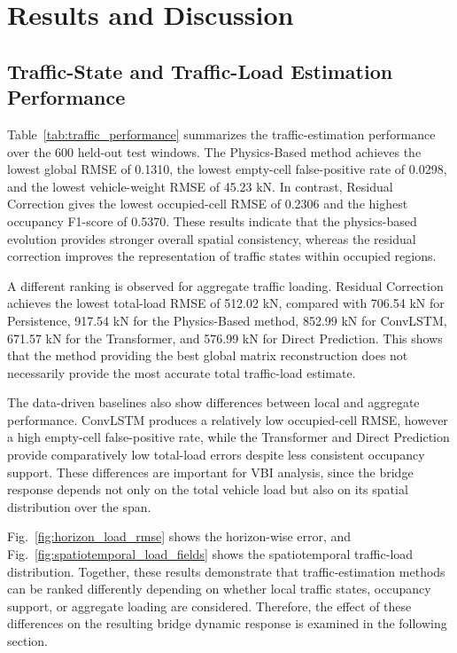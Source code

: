 \documentclass[journal]{IEEEtran}
\begin{document}
\section{Results and Discussion}

\subsection{Traffic-State and Traffic-Load Estimation Performance}
\label{sec:traffic_results}

Table~\ref{tab:traffic_performance} summarizes the
traffic-estimation performance over the 600 held-out test windows. The
Physics-Based method achieves the lowest global RMSE of 0.1310, the lowest
empty-cell false-positive rate of 0.0298, and the lowest vehicle-weight RMSE of
45.23 kN. In contrast, Residual Correction gives the lowest occupied-cell RMSE
of 0.2306 and the highest occupancy F1-score of 0.5370. These results indicate
that the physics-based evolution provides stronger overall spatial consistency,
whereas the residual correction improves the representation of traffic states
within occupied regions.

A different ranking is
observed for aggregate traffic loading. Residual Correction achieves the lowest
total-load RMSE of 512.02 kN, compared with 706.54 kN for Persistence, 917.54
kN for the Physics-Based method, 852.99 kN for ConvLSTM, 671.57 kN for the
Transformer, and 576.99 kN for Direct Prediction. This shows that the method
providing the best global matrix reconstruction does not necessarily provide
the most accurate total traffic-load estimate.

The data-driven baselines
also show differences between local and aggregate performance. ConvLSTM
produces a relatively low occupied-cell RMSE, however a high empty-cell
false-positive rate, while the Transformer and Direct Prediction provide
comparatively low total-load errors despite less consistent occupancy support.
These differences are important for VBI analysis, since the bridge response
depends not only on the total vehicle load but also on its spatial distribution
over the span.

Fig.~\ref{fig:horizon_load_rmse} shows the horizon-wise error, and Fig.~\ref{fig:spatiotemporal_load_fields} shows the spatiotemporal traffic-load distribution. Together, these
results demonstrate that traffic-estimation methods can be ranked differently
depending on whether local traffic states, occupancy support, or aggregate
loading are considered. Therefore, the effect of these differences on the
resulting bridge dynamic response is examined in the following section.
\end{document}
